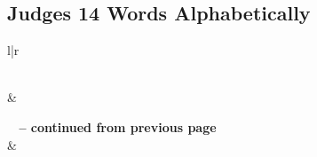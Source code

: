 

\subsection{Judges 14 Words Alphabetically}


\normalsize
 
\begin{center}
\begin{longtable}{l|r}
\caption[Judges 14 Words Alphabetically]{Judges 14 Words Alphabetically}\label{table:WordsAlphabetically for Judges 14} \\
\hline {} &  \\ \hline 
\endfirsthead
 
{{\bfseries \tablename\ \thetable{} -- continued from previous page}} \\  
\hline {} &  \\ \hline 
\endhead
 

\end{longtable}
\end{center}
